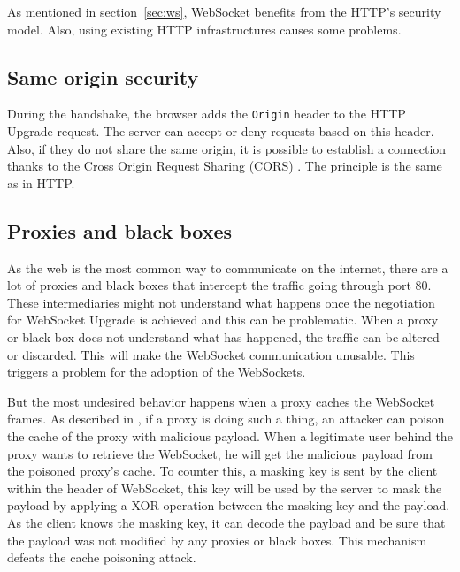 \documentclass[10pt,journal,compsoc]{IEEEtran}
\newcommand{\ttt}[1]{\texttt{#1}}
\newcommand{\ws}{WebSocket}
\begin{document}
As mentioned in section~\ref{sec:ws}, \ws{} benefits from the HTTP's security model. Also, using existing HTTP infrastructures causes some problems. %

\subsection{Same origin security}

During the handshake, the browser adds the \ttt{Origin} header to the HTTP Upgrade request.
The server can accept or deny requests based on this header. %
Also, if they do not share the same origin, it is possible to establish a connection thanks to the Cross Origin Request Sharing (CORS) \cite{talkingtoyourself}. %
The principle is the same as in HTTP.

\subsection{Proxies and black boxes}
\label{sec:key}
As the web is the most common way to communicate on the internet, there are a lot of proxies and black boxes that intercept the traffic going through port 80. %
These intermediaries might not understand what happens once the negotiation for \ws{} Upgrade is achieved and this can be problematic. %
When a proxy or black box does not understand what has happened, the traffic can be altered or discarded. %
This will make the \ws{} communication unusable.
This triggers a problem for the adoption of the \ws s.  %

But the most undesired behavior happens when a proxy caches the \ws{} frames.
As described in \cite{talkingtoyourself}, if a proxy is doing such a thing, an attacker can poison the cache of the proxy with malicious payload. %
When a legitimate user behind the proxy wants to retrieve the \ws{}, he will get the malicious payload from the poisoned proxy's cache.
To counter this, a masking key is sent by the client within the header of \ws{}, this key will be used by the server to mask the payload by applying a XOR operation between the masking key and the payload.
As the client knows the masking key, it can decode the payload and be sure that the payload was not modified by any proxies or black boxes.
This mechanism defeats the cache poisoning attack.
\end{document}
